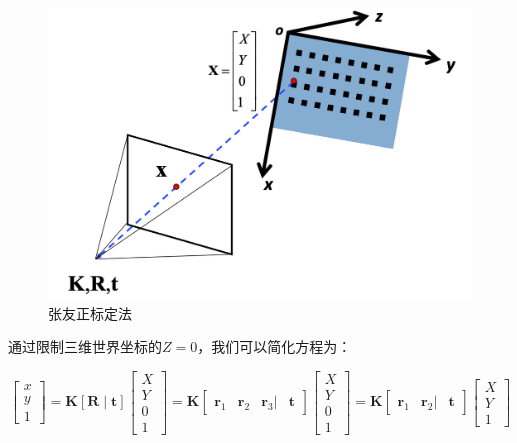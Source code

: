 \documentclass[12pt]{article}
\begin{document}
\begin{figure}[ht]
    \centering
    \includegraphics[scale=0.5]{./img/xjbd2.png}
    \caption{张友正标定法}
    \label{fig:xjbd2}
\end{figure}

通过限制三维世界坐标的$Z=0$，我们可以简化方程为：

\begin{equation}
    \nonumber
    \left[\begin{array}{l}
        x \\
        y \\
        1
        \end{array}\right]=\mathbf{K}[\mathbf{R} \mid \mathbf{t}]\left[\begin{array}{c}
        X \\
        Y \\
        0 \\
        1
        \end{array}\right]=
        \mathbf{K}\left[\begin{array}{llll}
        \mathbf{r}_{1} & \mathbf{r}_{2} & \mathbf{r}_{3}| & \mathbf{t}
        \end{array}\right]
        \left[\begin{array}{c}
        X \\
        Y \\
        0 \\
        1
        \end{array}\right]=
        \mathbf{K}\left[\begin{array}{lll}
        \mathbf{r}_{1} & \mathbf{r}_{2}| & \mathbf{t}
        \end{array}\right]
        \left[\begin{array}{c}
        X \\
        Y \\
        1
        \end{array}\right]
\end{equation}
\end{document}
